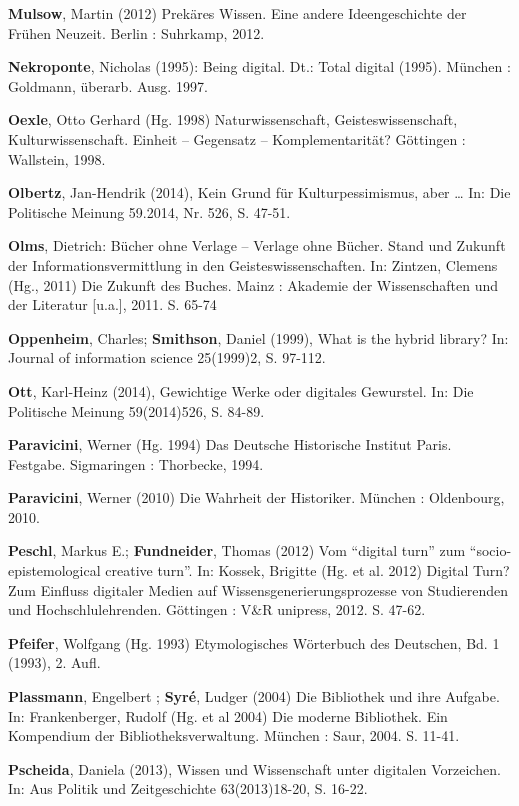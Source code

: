\documentclass[a4paper,
fontsize=11pt,
oneside,
numbers=noperiodatend,
parskip=half-,
bibliography=totoc,
final
]{scrartcl}
\begin{document}
\textbf{Mulsow}, Martin (2012) Prekäres Wissen. Eine andere
Ideengeschichte der Frühen Neuzeit. Berlin : Suhrkamp, 2012.

\textbf{Nekroponte}, Nicholas (1995): Being digital. Dt.: Total digital
(1995). München : Goldmann, überarb. Ausg. 1997.

\textbf{Oexle}, Otto Gerhard (Hg. 1998) Naturwissenschaft,
Geisteswissenschaft, Kulturwissenschaft. Einheit -- Gegensatz --
Komplementarität? Göttingen : Wallstein, 1998.

\textbf{Olbertz}, Jan-Hendrik (2014), Kein Grund für Kulturpessimismus,
aber \ldots{} In: Die Politische Meinung 59.2014, Nr. 526, S. 47-51.

\textbf{Olms}, Dietrich: Bücher ohne Verlage -- Verlage ohne Bücher.
Stand und Zukunft der Informationsvermittlung in den
Geisteswissenschaften. In: Zintzen, Clemens (Hg., 2011) Die Zukunft des
Buches. Mainz : Akademie der Wissenschaften und der Literatur
{[}u.a.{]}, 2011. S. 65-74

\textbf{Oppenheim}, Charles; \textbf{Smithson}, Daniel (1999), What is
the hybrid library? In: Journal of information science 25(1999)2, S.
97-112.

\textbf{Ott}, Karl-Heinz (2014), Gewichtige Werke oder digitales
Gewurstel. In: Die Politische Meinung 59(2014)526, S. 84-89.

\textbf{Paravicini}, Werner (Hg. 1994) Das Deutsche Historische Institut
Paris. Festgabe. Sigmaringen : Thorbecke, 1994.

\textbf{Paravicini}, Werner (2010) Die Wahrheit der Historiker. München
: Oldenbourg, 2010.

\textbf{Peschl}, Markus E.; \textbf{Fundneider}, Thomas (2012) Vom
\enquote{digital turn} zum \enquote{socio-epistemological creative
turn}. In: Kossek, Brigitte (Hg. et al. 2012) Digital Turn? Zum Einfluss
digitaler Medien auf Wissensgenerierungsprozesse von Studierenden und
Hochschlulehrenden. Göttingen : V\&R unipress, 2012. S. 47-62.

\textbf{Pfeifer}, Wolfgang (Hg. 1993) Etymologisches Wörterbuch des
Deutschen, Bd. 1 (1993), 2. Aufl.

\textbf{Plassmann}, Engelbert ; \textbf{Syré}, Ludger (2004) Die
Bibliothek und ihre Aufgabe. In: Frankenberger, Rudolf (Hg. et al 2004)
Die moderne Bibliothek. Ein Kompendium der Bibliotheksverwaltung.
München : Saur, 2004. S. 11-41.

\textbf{Pscheida}, Daniela (2013), Wissen und Wissenschaft unter
digitalen Vorzeichen. In: Aus Politik und Zeitgeschichte 63(2013)18-20,
S. 16-22.
\end{document}
